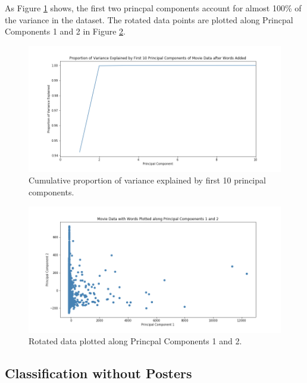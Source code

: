 \documentclass[12pt, oneside]{article}   	%
\begin{document}
As Figure \ref{fig:pca_var_explained} shows, the first two princpal components account for almost 100\% of the variance in the dataset. The rotated data points are plotted along Princpal Components 1 and 2 in Figure \ref{fig:pc1_pc2}.

\begin{figure}%
\includegraphics[width=\textwidth]{pca_var_explained}
\caption{\label{fig:pca_var_explained}Cumulative proportion of variance explained by first 10 principal components.}
\end{figure}

\begin{figure}%
\includegraphics[width=\textwidth]{pc1_pc2}
\caption{\label{fig:pc1_pc2}Rotated data plotted along Princpal Components 1 and 2.}
\end{figure}

\subsection{Classification without Posters}
\label{section:class_no_posters_results}
\end{document}
